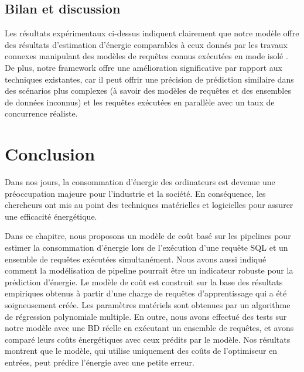\subsection{Bilan et discussion}
Les résultats expérimentaux ci-dessus indiquent clairement que notre modèle offre des résultats d'estimation d'énergie comparables à ceux donnés par les travaux connexes manipulant des modèles de requêtes connus exécutées en mode isolé \cite{Xu13, Kunjir12}. De plus, notre framework offre une amélioration significative par rapport aux techniques existantes, car il peut offrir une précision de prédiction similaire dans des scénarios plus complexes (à savoir des modèles de requêtes et des ensembles de données inconnus) et les requêtes exécutées en parallèle avec un taux de concurrence réaliste.


\section{Conclusion}
Dans nos jours, la consommation d'énergie des ordinateurs est devenue une préoccupation majeure pour l'industrie et la société. En conséquence, les chercheurs ont mis au point des techniques matérielles et logicielles pour assurer une efficacité énergétique.

Dans ce chapitre, nous proposons un modèle de coût basé sur les pipelines pour estimer la consommation d'énergie lors de l'exécution d'une requête SQL et un ensemble de requêtes exécutées simultanément.
Nous avons aussi indiqué comment la modélisation de pipeline pourrait être un indicateur robuste pour la prédiction d'énergie.
Le modèle de coût est construit sur la base des résultats empiriques obtenus à partir d'une charge de requêtes d'apprentissage qui a été soigneusement créée. Les paramètres matériels sont obtenues par un algorithme de régression polynomiale multiple.
En outre, nous avons effectué des tests sur notre modèle avec une BD réelle en exécutant un ensemble de requêtes, et avons comparé leurs coûts énergétiques avec ceux prédits par le modèle. Nos résultats montrent que le modèle, qui utilise uniquement des coûts de l'optimiseur en entrées, peut prédire l'énergie avec une petite erreur.
